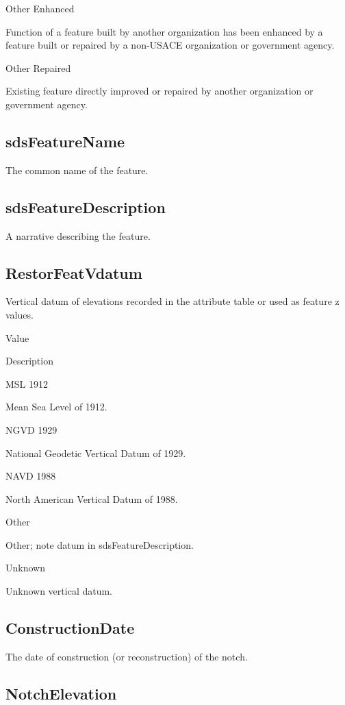 \documentclass[
  letterpaper,
  DIV=11,
  numbers=noendperiod]{scrreprt}
\begin{document}
Other Enhanced

Function of a feature built by another organization has been enhanced by
a feature built or repaired by a non-USACE organization or government
agency.

Other Repaired

Existing feature directly improved or repaired by another organization
or government agency.

\subsection{sdsFeatureName}\label{sdsfeaturename-9}

The common name of the feature.

\subsection{sdsFeatureDescription}\label{sdsfeaturedescription-9}

A narrative describing the feature.

\subsection{RestorFeatVdatum}\label{restorfeatvdatum-9}

Vertical datum of elevations recorded in the attribute table or used as
feature z values.

Value

Description

MSL 1912

Mean Sea Level of 1912.

NGVD 1929

National Geodetic Vertical Datum of 1929.

NAVD 1988

North American Vertical Datum of 1988.

Other

Other; note datum in sdsFeatureDescription.

Unknown

Unknown vertical datum.

\subsection{ConstructionDate}\label{constructiondate}

The date of construction (or reconstruction) of the notch.

\subsection{NotchElevation}\label{notchelevation}
\end{document}
